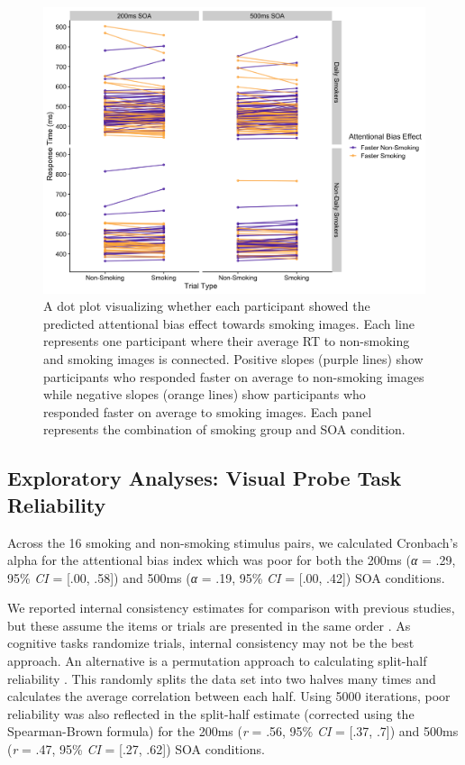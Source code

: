 \documentclass[empirical, authordate]{jote-new-article}
\begin{document}
\begin{figure}[t]

  \begin{fullwidth}
    \includegraphics[width=\linewidth]{media/image5.jpeg}
    \caption{
      A dot plot visualizing whether each participant showed the predicted attentional bias effect towards smoking images. Each line represents one participant where their average RT to non-smoking and smoking images is connected. Positive slopes (purple lines) show participants who responded faster on average to non-smoking images while negative slopes (orange lines) show participants who responded faster on average to smoking images. Each panel represents the combination of smoking group and SOA condition.
    }
    \label{fig:5}
  \end{fullwidth}


\end{figure}


\subsection{Exploratory Analyses: Visual Probe Task Reliability}

Across the 16 smoking and non-smoking stimulus pairs, we calculated Cronbach's alpha for the attentional bias index which was poor for both the 200ms (\emph{α} = .29, 95\% \emph{CI} = [.00, .58]) and 500ms (\emph{α} = .19, 95\% \emph{CI} = [.00, .42]) SOA conditions.

We reported internal consistency estimates for comparison with previous studies, but these assume the items or trials are presented in the same order \parencite{Parsons2019}. As cognitive tasks randomize trials, internal consistency may not be the best approach. An alternative is a permutation approach to calculating split-half reliability \parencite{Parsons2020}. This randomly splits the data set into two halves many times and calculates the average correlation between each half. Using 5000 iterations, poor reliability was also reflected in the split-half estimate (corrected using the Spearman-Brown formula) for the 200ms (\emph{r} = .56, 95\% \emph{CI} = [.37, .7]) and 500ms (\emph{r} = .47, 95\% \emph{CI} = [.27, .62]) SOA conditions.
\end{document}
